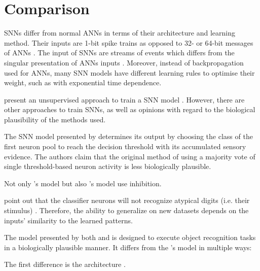 \section{Comparison}
\label{sec:comparison}

\acp{SNN} differ from normal \acp{ANN} in terms of their architecture and learning method.
Their inputs are 1-bit spike trains as opposed to 32- or 64-bit messages of \acp{ANN} \cite{SNN}.
The input of \acp{SNN} are streams of events which differs from the singular presentation of \acp{ANN} inputs \cite{ANN_SNN_conversion}.
Moreover, instead of backpropagation used for \acp{ANN}, many \ac{SNN} models have different learning rules to optimise their weight, 
such as  with exponential time dependence.

\authorsSNN{} present an unsupervised approach to train a \ac{SNN} model \cite{SNN}.
However, there are other approaches to train \acp{SNN}, as well as opinions with regard to the biological plausibility of the methods used.


The \ac{SNN} model presented by \authorsSTDPlike{} \cite{STDP_like} determines its output by 
choosing the class of the first neuron pool to reach the decision threshold with its accumulated sensory evidence.
The authors claim that the original method of using a majority vote of single threshold-based neuron activity is less biologically plausible.

Not only \authorsSTDPlike{}'s model \cite{STDP_like} but also \authorsSNN{}'s model \cite{SNN} use inhibition.

\authorsSTDPlike{} point out that the classifier neurons will not recognize atypical digits (i.e. their stimulus) \cite{STDP_like}.
Therefore, the ability to generalize on new datasets depends on the inputs' similarity to the learned patterns.


The model presented by both \authorsmultiScaleSTDP{} \cite{multi_scale_STDP} and \authorsSTDPvisFeat{} \cite{STDP_vis_feat} 
is designed to execute object recognition tasks in a biologically plausible manner.
It differs from the \authorsSNN{}'s model \cite{SNN} in multiple ways:

The first difference is the architecture \cite{multi_scale_STDP,STDP_vis_feat}.

